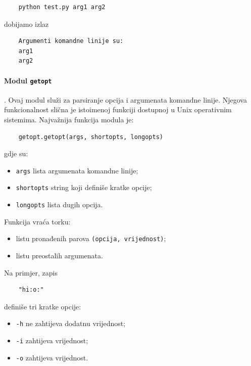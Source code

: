 \begin{verbatim}
	python test.py arg1 arg2
\end{verbatim}

dobijamo izlaz

\begin{verbatim}
	Argumenti komandne linije su:
	arg1
	arg2
\end{verbatim}

\paragraph{Modul \texttt{getopt}}.   Ovaj modul služi za parsiranje opcija i argumenata komandne linije. Njegova funkcionalnost slična je istoimenoj funkciji dostupnoj u Unix operativnim sistemima. Najvažnija funkcija modula je:

\begin{verbatim}
	getopt.getopt(args, shortopts, longopts)
\end{verbatim}

gdje su:

\begin{itemize}
	\item \texttt{args} lista argumenata komandne linije;
	\item \texttt{shortopts} string koji definiše kratke opcije;
	\item \texttt{longopts} lista dugih opcija.
\end{itemize}

Funkcija vraća torku:

\begin{itemize}
	\item listu pronađenih parova \texttt{(opcija, vrijednost)};
	\item listu preostalih argumenata.
\end{itemize}

Na primjer, zapis

\begin{verbatim}
	"hi:o:"
\end{verbatim}

definiše tri kratke opcije:

\begin{itemize}
	\item \texttt{-h} ne zahtijeva dodatnu vrijednost;
	\item \texttt{-i} zahtijeva vrijednost;
	\item \texttt{-o} zahtijeva vrijednost.
\end{itemize}


